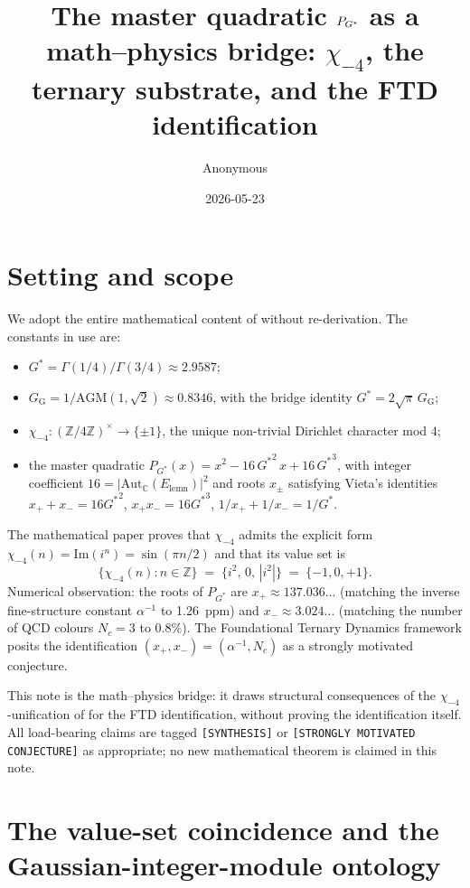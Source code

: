 \documentclass[11pt]{amsart}
\title{The master quadratic $P_{\Gs}$ as a math--physics bridge:
$\chi_{-4}$, the ternary substrate, and the FTD identification}
\author{Anonymous}
\date{2026-05-23}
\theoremstyle{plain}
\theoremstyle{definition}
\theoremstyle{remark}
\newcommand{\Gs}{G^{*}}
\newcommand{\Gss}{{G^{*}}^{2}}
\newcommand{\Gsss}{{G^{*}}^{3}}
\newcommand{\GG}{G_{\!\scriptscriptstyle\mathrm{G}}}
\newcommand{\Z}{\mathbb{Z}}
\newcommand{\C}{\mathbb{C}}
\newcommand{\Aut}{\mathrm{Aut}}
\begin{document}
\maketitle

\section{Setting and scope}\label{sec:setting}

We adopt the entire mathematical content of \cite{paper-gstar-A}
without re-derivation. The constants in use are:
\begin{itemize}[leftmargin=*, itemsep=2pt]
\item $\Gs = \Gamma(1/4)/\Gamma(3/4) \approx 2.9587$;
\item $\GG = 1/\mathrm{AGM}(1, \sqrt{2}) \approx 0.8346$, with the bridge identity $\Gs = 2\sqrt{\pi}\,\GG$;
\item $\chi_{-4}: (\Z/4\Z)^\times \to \{\pm 1\}$, the unique non-trivial Dirichlet character mod $4$;
\item the master quadratic $P_{\Gs}(x) = x^{2} - 16\,\Gss\,x + 16\,\Gsss$, with integer coefficient $16 = |\Aut_\C(E_{\mathrm{lemn}})|^{2}$ and roots $x_{\pm}$ satisfying Vieta's identities $x_+ + x_- = 16\Gss$, $x_+ x_- = 16\Gsss$, $1/x_+ + 1/x_- = 1/\Gs$.
\end{itemize}
The mathematical paper \cite{paper-gstar-A} proves that $\chi_{-4}$
admits the explicit form $\chi_{-4}(n) = \mathrm{Im}(i^{n}) = \sin(\pi n/2)$
and that its value set is
\[
\{\chi_{-4}(n) : n \in \Z\} \;=\; \{i^{2},\, 0,\, |i^{2}|\} \;=\; \{-1, 0, +1\}.
\]
Numerical observation: the roots of $P_{\Gs}$ are
$x_{+} \approx 137.036\ldots$ (matching the inverse fine-structure constant
$\alpha^{-1}$ to 1.26~ppm) and $x_{-} \approx 3.024\ldots$ (matching
the number of QCD colours $N_{c} = 3$ to 0.8\%). The Foundational
Ternary Dynamics framework \cite{ftd-spec} posits the identification
$(x_{+}, x_{-}) = (\alpha^{-1}, N_{c})$ as a strongly motivated
conjecture.

This note is the math--physics bridge: it draws structural consequences
of the $\chi_{-4}$-unification of \cite{paper-gstar-A} for the FTD
identification, without proving the identification itself. All
load-bearing claims are tagged \texttt{[SYNTHESIS]} or \texttt{[STRONGLY
MOTIVATED CONJECTURE]} as appropriate; no new mathematical theorem is
claimed in this note.

\section{The value-set coincidence and the Gaussian-integer-module ontology}\label{sec:ontology}
\end{document}
